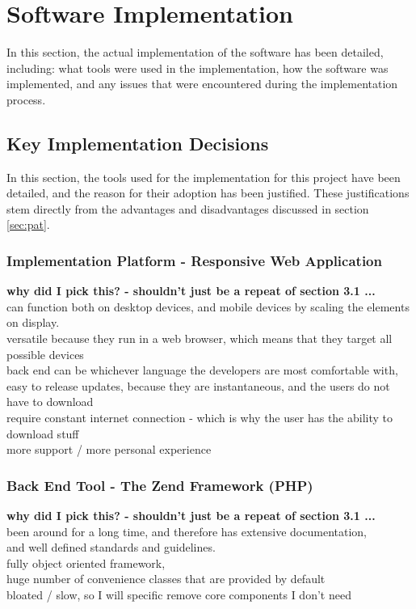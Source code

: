 \section{Software Implementation}
In this section, the actual implementation of the software has been detailed, including: what tools were used in the implementation, how the software was implemented, and any issues that were encountered during the implementation process.

\subsection{Key Implementation Decisions}
\label{sec:kid}
In this section, the tools used for the implementation for this project have been detailed, and the reason for their adoption has been justified. These justifications stem directly from the advantages and disadvantages discussed in section \ref{sec:pat}.

\subsubsection{Implementation Platform - Responsive Web Application}
{\color{red} 
	\textbf{why did I pick this? - shouldn't just be a repeat of section 3.1 ...}\\
can function both on desktop devices, and mobile devices by scaling the elements on display. \\
versatile because they run in a web browser, which means that they target all possible devices \\
back end can be whichever language the developers are most comfortable with, \\
easy to release updates, because they are instantaneous, and the users do not have to download \\
require constant internet connection - which is why the user has the ability to download stuff\\
more support / more personal experience\\
}
\subsubsection{Back End Tool - The Zend Framework (PHP)}
{\color{red} 
	\textbf{why did I pick this? - shouldn't just be a repeat of section 3.1 ...}\\
been around for a long time, and therefore has extensive documentation, \\
and well defined standards and guidelines. \\
fully object oriented framework, \\
huge number of convenience classes that are provided by default \\
bloated / slow, so I will specific remove core components I don't need\\
}

